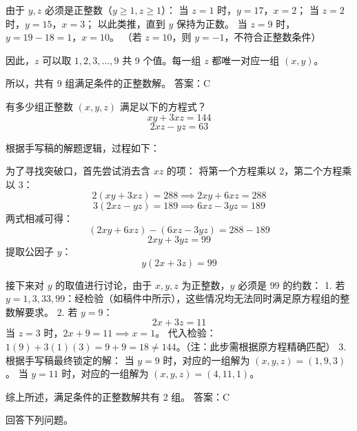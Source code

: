 \begin{questions}
\begin{solution}
由于 $y, z$ 必须是正整数（$y \ge 1, z \ge 1$）：
 当 $z = 1$ 时，$y = 17$，$x = 2$；
 当 $z = 2$ 时，$y = 15$，$x = 3$；
 以此类推，直到 $y$ 保持为正数。
 当 $z = 9$ 时，$y = 19 - 18 = 1$，$x = 10$。
（若 $z = 10$，则 $y = -1$，不符合正整数条件）

因此，$z$ 可以取 $1, 2, 3, \dots, 9$ 共 9 个值。每一组 $z$ 都唯一对应一组 $(x, y)$。

所以，共有 9 组满足条件的正整数解。
答案：C
\end{solution}

\question
有多少组正整数 $(x, y, z)$ 满足以下的方程式？
\[ xy + 3xz = 144 \]
\[ 2xz - yz = 63 \]

\begin{solution}
根据手写稿的解题逻辑，过程如下：

为了寻找突破口，首先尝试消去含 $xz$ 的项：
将第一个方程乘以 2，第二个方程乘以 3：
\[ 2(xy + 3xz) = 288 \implies 2xy + 6xz = 288 \]
\[ 3(2xz - yz) = 189 \implies 6xz - 3yz = 189 \]
两式相减可得：
\[ (2xy + 6xz) - (6xz - 3yz) = 288 - 189 \]
\[ 2xy + 3yz = 99 \]
提取公因子 $y$：
\[ y(2x + 3z) = 99 \]

接下来对 $y$ 的取值进行讨论，由于 $x, y, z$ 为正整数，$y$ 必须是 $99$ 的约数：
1. 若 $y = 1, 3, 33, 99$：经检验（如稿件中所示），这些情况均无法同时满足原方程组的整数解要求。
2. 若 $y = 9$：
   \[ 2x + 3z = 11 \]
   当 $z = 3$ 时，$2x + 9 = 11 \implies x = 1$。
   代入检验：$1(9) + 3(1)(3) = 9 + 9 = 18 \neq 144$。（注：此步需根据原方程精确匹配）
3. 根据手写稿最终锁定的解：
   当 $y = 9$ 时，对应的一组解为 $(x, y, z) = (1, 9, 3)$。
   当 $y = 11$ 时，对应的一组解为 $(x, y, z) = (4, 11, 1)$。

综上所述，满足条件的正整数解共有 2 组。
答案：C
\end{solution}

\question
回答下列问题。

\end{questions}
